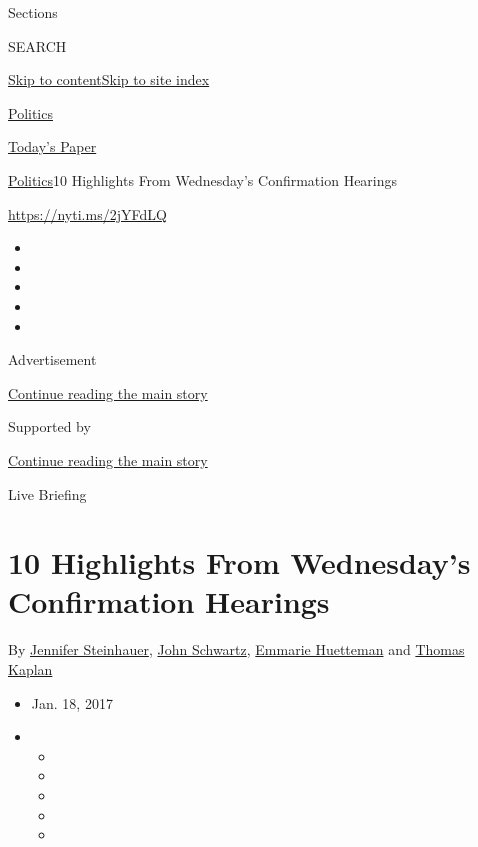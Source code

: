 Sections

SEARCH

\protect\hyperlink{site-content}{Skip to
content}\protect\hyperlink{site-index}{Skip to site index}

\href{https://www.nytimes.com/section/politics}{Politics}

\href{https://myaccount.nytimes.com/auth/login?response_type=cookie\&client_id=vi}{}

\href{https://www.nytimes.com/section/todayspaper}{Today's Paper}

\href{/section/politics}{Politics}\textbar{}10 Highlights From
Wednesday's Confirmation Hearings

\url{https://nyti.ms/2jYFdLQ}

\begin{itemize}
\item
\item
\item
\item
\item
\end{itemize}

Advertisement

\protect\hyperlink{after-top}{Continue reading the main story}

Supported by

\protect\hyperlink{after-sponsor}{Continue reading the main story}

Live Briefing

\hypertarget{10-highlights-from-wednesdays-confirmation-hearings}{%
\section{10 Highlights From Wednesday's Confirmation
Hearings}\label{10-highlights-from-wednesdays-confirmation-hearings}}

By \href{http://www.nytimes.com/by/jennifer-steinhauer}{Jennifer
Steinhauer}, \href{http://www.nytimes.com/by/john-schwartz}{John
Schwartz}, \href{https://www.nytimes.com/by/emmarie-huetteman}{Emmarie
Huetteman} and \href{http://www.nytimes.com/by/thomas-kaplan}{Thomas
Kaplan}

\begin{itemize}
\item
  Jan. 18, 2017
\item
  \begin{itemize}
  \item
  \item
  \item
  \item
  \item
  \end{itemize}
\end{itemize}

